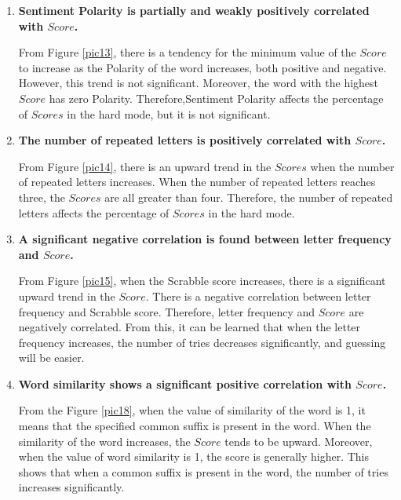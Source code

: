 \documentclass[12pt]{article}  %
\begin{document}
\begin{enumerate}[\bfseries 1.]
	\setlength{\parsep}{0ex} %
	\setlength{\topsep}{0.5pt} %
	\setlength{\itemsep}{0.5pt} 
	\item \textbf{Sentiment Polarity is partially and weakly positively correlated with $Score$.}
	
	From Figure \ref{pic13}, there is a tendency for the minimum value of the $Score$ to increase as the Polarity of the word increases, both positive and negative. However, this trend is not significant. Moreover, the word with the highest $Score$ has zero Polarity. Therefore,Sentiment Polarity affects the percentage of $Scores$ in the hard mode, but it is not significant.
	\item  \textbf{The number of repeated letters is positively correlated with $Score$.}
	
	From Figure \ref{pic14}, there is an upward trend in the $Scores$ when the number of repeated letters increases. When the number of repeated letters reaches three, the $Scores$ are all greater than four. Therefore, the number of repeated letters affects the percentage of $Scores$ in the hard mode. 
	\item \textbf{A significant negative correlation is found between letter frequency and $Score$.}
	
	From Figure \ref{pic15}, when the Scrabble score increases, there is a significant upward trend in the $Score$. There is a negative correlation between letter frequency and Scrabble score. Therefore, letter frequency and $Score$ are negatively correlated. From this, it can be learned that when the letter frequency increases, the number of tries decreases significantly, and guessing will be easier.
	\item \textbf{Word similarity shows a significant positive correlation with $Score$.}
	
	From the Figure \ref{pic18}, when the value of similarity of the word is 1, it means that the specified common suffix is present in the word. When the similarity of the word increases, the $Score$ tends to be upward. Moreover, when the value of word similarity is 1, the score is generally higher. This shows that when a common suffix is present in the word, the number of tries increases significantly.
\end{enumerate}
\end{document}
